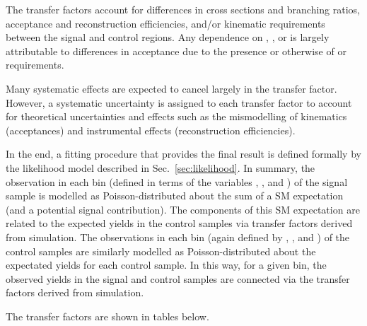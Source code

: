 The transfer factors account for differences in cross sections and
branching ratios, acceptance and reconstruction efficiencies, and/or
kinematic requirements between the signal and control regions. Any
dependence on \njet, \nb, or \HT is largely attributable to
differences in acceptance due to the presence or otherwise of \alphat
or \mht requirements.

Many systematic effects are expected to cancel largely in the transfer
factor. However, a systematic uncertainty is assigned to each transfer
factor to account for theoretical uncertainties and effects such as
the mismodelling of kinematics (\eg acceptances) and instrumental
effects (\eg reconstruction efficiencies).

In the end, a fitting procedure that provides the final result is
defined formally by the likelihood model described in
Sec.~\ref{sec:likelihood}. In summary, the observation in each bin
(defined in terms of the variables \njet, \nb, and \scalht) of the
signal sample is modelled as Poisson-distributed about the sum of a SM
expectation (and a potential signal contribution). The components of
this SM expectation are related to the expected yields in the control
samples via transfer factors derived from simulation. The observations
in each bin (again defined by \njet, \nb, and \scalht) of the control
samples are similarly modelled as Poisson-distributed about the
expectated yields for each control sample. In this way, for a given
bin, the observed yields in the signal and control samples are
connected via the transfer factors derived from simulation. 



The transfer factors are shown in tables below.

